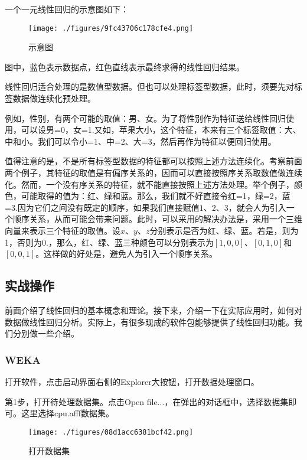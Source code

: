 一个一元线性回归的示意图如下：
\begin{figure}[ht]
\centering
\texttt{[image: ./figures/9fc43706c178cfe4.png]}
\caption{示意图} \label{fig_LiGr_1}
\end{figure}
图中，蓝色表示数据点，红色直线表示最终求得的线性回归结果。

线性回归适合处理的是数值型数据。但也可以处理标签型数据，此时，须要先对标签数据做连续化预处理。

例如，性别，有两个可能的取值：男、女。为了将性别作为特征送给线性回归使用，可以设男=0，女=1.又如，苹果大小，这个特征，本来有三个标签取值：大、中和小。我们可以令小=1、中=2、大=3，然后再作为特征以便回归使用。

值得注意的是，不是所有标签型数据的特征都可以按照上述方法连续化。考察前面两个例子，其特征的取值是有偏序关系的，因而可以直接按照序关系取数值做连续化。然而，一个没有序关系的特征，就不能直接按照上述方法处理。举个例子，颜色，可能取得的值为：红、绿和蓝。那么，我们就不好直接令红=1，绿=2，蓝=3.因为它们之间没有既定的顺序，如果我们直接赋值$1$、$2$、$3$，就会人为引入一个顺序关系，从而可能会带来问题。此时，可以采用的解决办法是，采用一个三维向量来表示三个特征的取值。设$x$、$y$、$z$分别表示是否为红、绿、蓝。若是，则为1，否则为0.，那么，红、绿、蓝三种颜色可以分别表示为$[1,0,0]$、$[0,1,0]$和$[0,0,1]$。这样做的好处是，避免人为引入一个顺序关系。

\subsection{实战操作}

前面介绍了线性回归的基本概念和理论。接下来，介绍一下在实际应用时，如何对数据做线性回归分析。实际上，有很多现成的软件包能够提供了线性回归功能。我们分别做一些介绍。

\subsubsection{WEKA}


打开软件，点击启动界面右侧的Explorer大按钮，打开数据处理窗口。

第1步，打开待处理数据集。点击Open file...，在弹出的对话框中，选择数据集即可。这里选择cpu.afff数据集。
\begin{figure}[ht]
\centering
\texttt{[image: ./figures/08d1acc6381bcf42.png]}
\caption{打开数据集} \label{fig_LiGr_5}
\end{figure}

